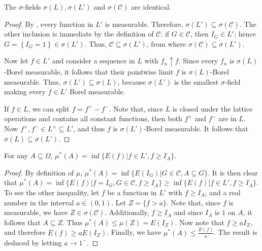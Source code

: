 \begin{lemm}\label{lemma:equality of sigma-fields in Daniell theory}
		The \(\sigma\)-fields \(\sigma(L), \sigma(L')\) and \(\sigma(\mathcal{C})\) are identical.
\end{lemm}
\begin{proof}
		By , every function in \(L'\) is measurable. Therefore, \(\sigma(L')\subseteq\sigma(\mathcal{C})\). The other inclusion is immediate by the definition of \(\mathcal{C}\): if \(G\in\mathcal{C}\), then \(I_G\in L'\); hence \(G=\left\{I_G=1\right\}\in\sigma(L')\). Thus, \(\mathcal{C}\subseteq\sigma(L')\), from where \(\sigma(\mathcal{C})\subseteq\sigma(L')\).

		Now let \(f\in L'\) and consider a sequence in  \(L\) with \(f_n\uparrow f\). Since every \(f_n\) is \(\sigma(L)\)-Borel measurable, it follows that their pointwise limit \(f\) is \(\sigma(L)\)-Borel measurable. Thus, \(\sigma(L')\subseteq\sigma(L)\), because \(\sigma(L')\) is the smallest \(\sigma\)-field making every \(f\in L'\) Borel measurable.

		If \(f\in L\), we can split \(f=f^{+}-f^{-}\). Note that, since \(L\) is closed under the lattice operations and contains all constant functions, then both \(f^{+}\) and \(f^{-}\) are in \(L\). Now \(f^{+},f^{-}\in L^{+}\subseteq L'\), and thus \(f\) is \(\sigma(L')\)-Borel measurable. It follows that \(\sigma(L)\subseteq\sigma(L')\).
\end{proof}
\begin{lemm}\label{lemma:outer measure on L'}
		For any \(A\subseteq\Omega\), \(\mu^*(A)=\inf\{E(f)\left|f\in L', f\geq I_A\right.\}\).
\end{lemm}
\begin{proof}
		By definition of \(\mu\), \(\mu^*(A)=\inf\{E(I_G)\left|G\in\mathcal{C}, A\subseteq G\right.\}\). It is then clear that \(\mu^*(A)=\inf\{E(f)\left|f=I_G, G\in\mathcal{C}, f\geq I_A\right.\}\geq\inf\{E(f)\left|f\in L', f\geq I_A\right.\}\). To see the other inequality, let \(f\) be a function in \(L'\) with \(f\geq I_A\), and a real number in the interval \(a\in(0,1)\). Let \(Z=\{f>a\}\). Note that, since \(f\) is measurable, we have \(Z\in\sigma(\mathcal{C})\). Additionally, \(f\geq I_A\) and since \(I_A\) is \(1\) on \(A\), it follows that \(A\subseteq Z\). Thus \(\mu^*(A)\leq \mu(Z)=E(I_Z)\). Now note that \(f\geq aI_Z\), and therefore \(E(f)\geq aE(I_Z)\). Finally, we have \(\mu^*(A)\leq \frac{E(f)}{a}\). The result is deduced by letting \(a\to 1^{-}\).
\end{proof}
